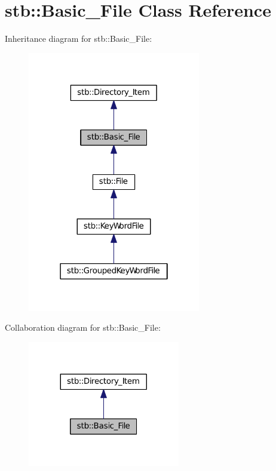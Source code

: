 \hypertarget{classstb_1_1Basic__File}{\section{stb\+:\+:Basic\+\_\+\+File Class Reference}
\label{classstb_1_1Basic__File}
}


Inheritance diagram for stb\+:\+:Basic\+\_\+\+File\+:
\nopagebreak
\begin{figure}[H]
\begin{center}
\leavevmode
\includegraphics[width=214pt]{classstb_1_1Basic__File__inherit__graph}
\end{center}
\end{figure}


Collaboration diagram for stb\+:\+:Basic\+\_\+\+File\+:
\nopagebreak
\begin{figure}[H]
\begin{center}
\leavevmode
\includegraphics[width=188pt]{classstb_1_1Basic__File__coll__graph}
\end{center}
\end{figure}
